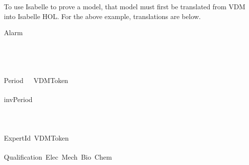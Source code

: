 To use Isabelle to prove a model, that model must first be translated from VDM into Isabelle HOL. For the above example, translations are below.

\hfill\break
\hfill\break
\ttfamily
\syntaxNULL{}Alarm\hspace*{\fill}\\
\hspace*{\fill}\\
\hspace*{\fill}\\
\hspace*{\fill}\\
\hspace*{\fill}\\
Period{\ }{\ }{\ }\syntaxOPERATOR{=}{\ }VDMToken\hspace*{\fill}\\
\hspace*{\fill}\\
inv\usebox{\underscorebox}Period{\ }\syntaxOPERATOR{::}{\ }\hspace*{\fill}\\
\hspace*{\fill}\\
\hspace*{\fill}\\
\hspace*{\fill}\\
ExpertId{\ }\syntaxOPERATOR{=}{\ }VDMToken\hspace*{\fill}\\
\hspace*{\fill}\\
Qualification{\ }\syntaxOPERATOR{=}{\ }Elec{\ }\syntaxOPERATOR{|}{\ }Mech{\ }\syntaxOPERATOR{|}{\ }Bio{\ }\syntaxOPERATOR{|}{\ }Chem\hspace*{\fill}\\
